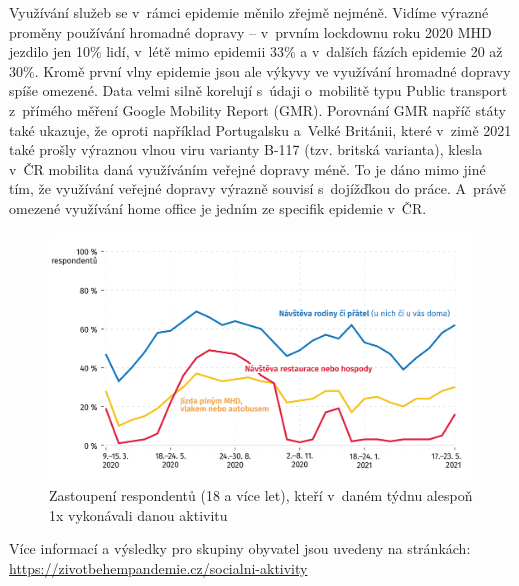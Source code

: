 Využívání služeb se v rámci epidemie měnilo zřejmě nejméně. Vidíme výrazné proměny používání hromadné dopravy – v~prvním lockdownu roku 2020 MHD jezdilo jen 10\% lidí, v létě mimo epidemii 33\% a v~dalších fázích epidemie 20 až 30\%. Kromě první vlny epidemie jsou ale výkyvy ve využívání hromadné dopravy spíše omezené. Data velmi silně korelují s~údaji o~mobilitě typu Public transport z přímého měření Google Mobility Report (GMR). Porovnání GMR napříč státy také ukazuje, že oproti například Portugalsku a Velké Británii, které v zimě 2021 také prošly výraznou vlnou viru varianty B-117 (tzv. britská varianta), klesla v~ČR mobilita daná využíváním veřejné dopravy méně. To je dáno mimo jiné tím, že využívání veřejné dopravy výrazně souvisí s dojížďkou do práce. A~právě omezené využívání home office je jedním ze specifik epidemie v ČR.

\begin{figure}[ht]
    \centering
    \includegraphics[width=\textwidth]{./pic/zbp-graf3.png}
    \caption{Zastoupení respondentů (18 a více let), kteří v daném týdnu alespoň 1x vykonávali danou aktivitu}
    \label{fig:zbp3}
\end{figure}


Více informací a výsledky pro skupiny obyvatel jsou uvedeny na stránkách: \url{https://zivotbehempandemie.cz/socialni-aktivity}



